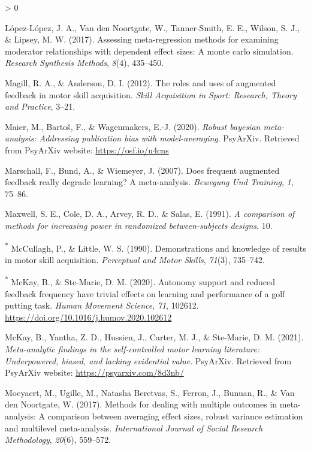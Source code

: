 \documentclass[
  english,
  man, donotrepeattitle,mask,floatsintext]{apa7}
\newlength{\cslhangindent}
\newenvironment{CSLReferences}[2] %
 {%
  \setlength{\parindent}{0pt}
  \ifodd #1 \everypar{\setlength{\hangindent}{\cslhangindent}}\ignorespaces\fi
  \ifnum #2 > 0
  \setlength{\parskip}{#2\baselineskip}
  \fi
 }%
 {}
\begin{document}
\begin{CSLReferences}{1}{0}
\leavevmode\hypertarget{ref-Lopez2017}{}%
López-López, J. A., Van den Noortgate, W., Tanner-Smith, E. E., Wilson, S. J., \& Lipsey, M. W. (2017). Assessing meta-regression methods for examining moderator relationships with dependent effect sizes: A monte carlo simulation. \emph{Research Synthesis Methods}, \emph{8}(4), 435--450.

\leavevmode\hypertarget{ref-Magill2012}{}%
Magill, R. A., \& Anderson, D. I. (2012). The roles and uses of augmented feedback in motor skill acquisition. \emph{Skill Acquisition in Sport: Research, Theory and Practice}, 3--21.

\leavevmode\hypertarget{ref-Maier2020}{}%
Maier, M., Bartoš, F., \& Wagenmakers, E.-J. (2020). \emph{Robust bayesian meta-analysis: Addressing publication bias with model-averaging}. PsyArXiv. Retrieved from PsyArXiv website: \url{https://osf.io/u4cns}

\leavevmode\hypertarget{ref-Marschall2007}{}%
Marschall, F., Bund, A., \& Wiemeyer, J. (2007). Does frequent augmented feedback really degrade learning? A meta-analysis. \emph{Bewegung Und Training}, \emph{1}, 75--86.

\leavevmode\hypertarget{ref-Maxwell1991}{}%
Maxwell, S. E., Cole, D. A., Arvey, R. D., \& Salas, E. (1991). \emph{A comparison of methods for increasing power in randomized between-subjects designs}. 10.

\leavevmode\hypertarget{ref-McCullagh1990}{}%
\textsuperscript{*} McCullagh, P., \& Little, W. S. (1990). Demonstrations and knowledge of results in motor skill acquisition. \emph{Perceptual and Motor Skills}, \emph{71}(3), 735--742.

\leavevmode\hypertarget{ref-McKay2020}{}%
\textsuperscript{*} McKay, B., \& Ste-Marie, D. M. (2020). Autonomy support and reduced feedback frequency have trivial effects on learning and performance of a golf putting task. \emph{Human Movement Science}, \emph{71}, 102612. \url{https://doi.org/10.1016/j.humov.2020.102612}

\leavevmode\hypertarget{ref-McKay2021}{}%
McKay, B., Yantha, Z. D., Hussien, J., Carter, M. J., \& Ste-Marie, D. M. (2021). \emph{Meta-analytic findings in the self-controlled motor learning literature: Underpowered, biased, and lacking evidential value}. PsyArXiv. Retrieved from PsyArXiv website: \url{https://psyarxiv.com/8d3nb/}

\leavevmode\hypertarget{ref-Moeyaert2017}{}%
Moeyaert, M., Ugille, M., Natasha Beretvas, S., Ferron, J., Bunuan, R., \& Van den Noortgate, W. (2017). Methods for dealing with multiple outcomes in meta-analysis: A comparison between averaging effect sizes, robust variance estimation and multilevel meta-analysis. \emph{International Journal of Social Research Methodology}, \emph{20}(6), 559--572.


\end{CSLReferences}
\end{document}
